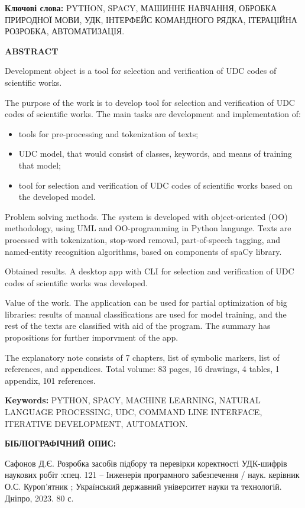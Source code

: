 \documentclass[14pt]{extarticle}
\begin{document}
\textbf{Ключові слова:} \MakeUppercase{python, spaCy, машинне навчання, обробка природної мови,
УДК, інтерфейс командного рядка, ітераційна розробка, автоматизація.}

\newpage

\noindent
\textbf{ABSTRACT}

Development object is a tool for selection and
verification of UDC codes of scientific works.

The purpose of the work is to develop tool for selection and
verification of UDC codes of scientific works. The main tasks are development
and implementation of:

\begin{itemize}[itemsep=1pt,labelindent=\dimexpr{}\relax, leftmargin=*]
  \item tools for pre-processing and tokenization of texts;
  \item UDC model, that would consist of classes, keywords, and means of
	training that model;
  \item tool for selection and verification of UDC codes of scientific works
	based on the developed model.
\end{itemize}

Problem solving methods. The system is developed with object-oriented (OO)
methodology, using UML and OO-programming in Python language.
Texts are processed with tokenization, stop-word removal, part-of-speech tagging,
and named-entity recognition algorithms, based on components of spaCy library.

Obtained results. A desktop app with CLI for selection and
verification of UDC codes of scientific works was developed.

Value of the work. The application can be used for partial optimization of
big libraries: results of manual classifications are used for model training,
and the rest of the texts are classified with aid of the program.
The summary has propositions for further imporvment of the app.

The explanatory note consists of 7 chapters, list of symbolic markers,
list of references, and appendices.
Total volume: 83 pages, 16 drawings, 4 tables, 1 appendix, 101 references.

\textbf{Keywords:} \MakeUppercase{python, spaCy, machine learning,
Natural language processing,
UDC, command line interface, iterative development, automation.}

\newpage
\noindent
\textbf{БІБЛІОГРАФІЧНИЙ ОПИС:}

Сафонов Д.Є.
Розробка засобів підбору та перевірки коректності УДК-шифрів наукових
робіт
:спец. 121 – Інженерія програмного забезпечення
/ наук. керівник О.С. Куроп'ятник ;
Український державний університет науки та технологій. Дніпро, 2023. 80 с.
\end{document}
